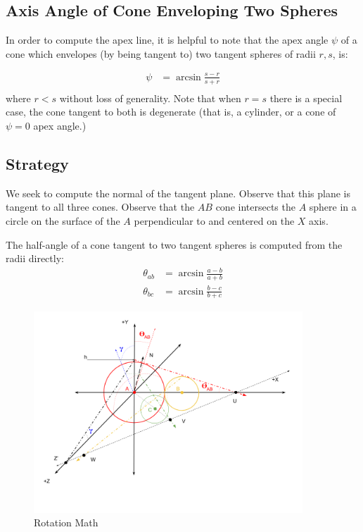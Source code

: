 \documentclass{article}
\begin{document}
\subsection{Axis Angle of Cone Enveloping Two Spheres}

In order to compute the apex line, it is helpful
to note that the apex angle $\psi$ of a cone which envelopes (by being tangent to) two tangent
spheres of radii $r,s$, is:

\begin{align}
 \psi &= \arcsin{\frac{s - r}{s + r}} \\
\end{align}
where $r < s$ without loss of generality. Note that when $r = s$
there is a special case,
the cone tangent to both is degenerate (that is, a cylinder, or a cone of
$\psi = 0$ apex angle.)

\subsection{Strategy}

We seek to compute the normal of the tangent plane.
Observe that this plane is tangent to all three cones.
Observe that the $AB$ cone intersects
the $A$ sphere in a circle on the surface of the $A$ perpendicular to and centered on the $X$ axis.

The half-angle of a cone tangent to two tangent spheres is computed from the radii directly:
\begin{align}
  \theta_{ab} &= \arcsin{\frac{a - b}{a + b}} \label{eq:theta}\\
  \theta_{bc} &= \arcsin{\frac{b - c}{b + c}}
\end{align}


\begin{figure}
     \centering
     \includegraphics[width=0.9\textwidth]{figures/RotationMath.png}
     \caption{Rotation Math}
  \label{fig:rotation}
\end{figure}
\end{document}
